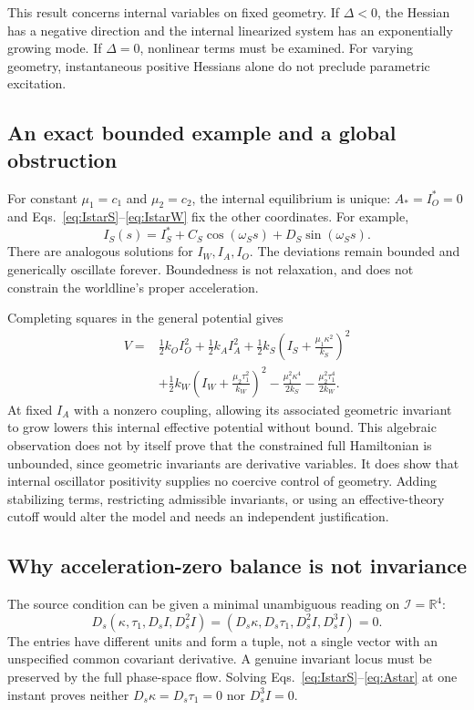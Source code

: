 \documentclass[aip,jmp,reprint,onecolumn,amsmath,amssymb]{revtex4-2}
\newcommand{\Ds}{D_s}
\newcommand{\I}{\mathcal I}
\begin{document}
This result concerns internal variables on fixed geometry. If $\Delta<0$, the Hessian has a negative direction and the internal linearized system has an exponentially growing mode. If $\Delta=0$, nonlinear terms must be examined. For varying geometry, instantaneous positive Hessians alone do not preclude parametric excitation.

\subsection{An exact bounded example and a global obstruction}
For constant $\mu_1=c_1$ and $\mu_2=c_2$, the internal equilibrium is unique: $A_*=I_O^*=0$ and Eqs.~\eqref{eq:IstarS}--\eqref{eq:IstarW} fix the other coordinates. For example,
\begin{equation}
 I_S(s)=I_S^*+C_S\cos(\omega_Ss)+D_S\sin(\omega_Ss).
 \label{eq:forced}
\end{equation}
There are analogous solutions for $I_W,I_A,I_O$. The deviations remain bounded and generically oscillate forever. Boundedness is not relaxation, and does not constrain the worldline's proper acceleration.

Completing squares in the general potential gives
\begin{align}
 V={}&\tfrac12 k_O I_O^2+\tfrac12 k_A I_A^2
 +\tfrac12 k_S\left(I_S+\frac{\mu_1\kappa^2}{k_S}\right)^2\nonumber\\
 &+\tfrac12 k_W\left(I_W+\frac{\mu_2\tau_1^2}{k_W}\right)^2
 -\frac{\mu_1^2\kappa^4}{2k_S}
 -\frac{\mu_2^2\tau_1^4}{2k_W}.
 \label{eq:negative}
\end{align}
At fixed $I_A$ with a nonzero coupling, allowing its associated geometric invariant to grow lowers this internal effective potential without bound. This algebraic observation does not by itself prove that the constrained full Hamiltonian is unbounded, since geometric invariants are derivative variables. It does show that internal oscillator positivity supplies no coercive control of geometry. Adding stabilizing terms, restricting admissible invariants, or using an effective-theory cutoff would alter the model and needs an independent justification.

\subsection{Why acceleration-zero balance is not invariance}
The source condition can be given a minimal unambiguous reading on $\I=\mathbb R^4$:
\begin{equation}
 \Ds(\kappa,\tau_1,\Ds I,\Ds^2I)
 =(\Ds\kappa,\Ds\tau_1,\Ds^2I,\Ds^3I)=0.
 \label{eq:invariant}
\end{equation}
The entries have different units and form a tuple, not a single vector with an unspecified common covariant derivative. A genuine invariant locus must be preserved by the full phase-space flow. Solving Eqs.~\eqref{eq:IstarS}--\eqref{eq:Astar} at one instant proves neither $\Ds\kappa=\Ds\tau_1=0$ nor $\Ds^3I=0$.
\end{document}
